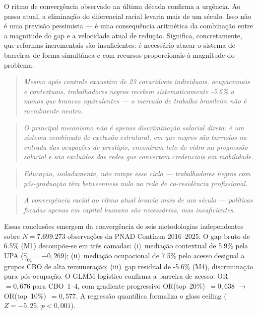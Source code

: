 \documentclass[12pt, a4paper, oneside]{article}
\begin{document}
O ritmo de convergência observado na última década confirma a urgência.
Ao passo atual, a eliminação do diferencial racial levaria mais de um século.
Isso não é uma previsão pessimista --- é uma consequência aritmética da
combinação entre a magnitude do gap e a velocidade atual de redução.
Significa, concretamente, que reformas incrementais são insuficientes:
é necessário atacar o sistema de barreiras de forma simultânea e com recursos
proporcionais à magnitude do problema.

\medskip

\begin{quote}
\textit{Mesmo após controle exaustivo de 23 covariáveis individuais,
ocupacionais e contextuais, trabalhadores negros recebem sistematicamente
-5.6\% a menos que brancos equivalentes --- o mercado de
trabalho brasileiro não é racialmente neutro.}
\end{quote}

\begin{quote}
\textit{O principal mecanismo não é apenas discriminação salarial direta:
é um sistema combinado de exclusão estrutural, em que negros são barrados
na entrada das ocupações de prestígio, encontram teto de vidro na progressão
salarial e são excluídos das redes que convertem credenciais em mobilidade.}
\end{quote}

\begin{quote}
\textit{Educação, isoladamente, não rompe esse ciclo --- trabalhadores negros
com pós-graduação têm betweenness nulo na rede de co-residência profissional.}
\end{quote}

\begin{quote}
\textit{A convergência racial ao ritmo atual levaria mais de um século ---
políticas focadas apenas em capital humano são necessárias, mas insuficientes.}
\end{quote}

\medskip

Essas conclusões emergem da convergência de seis metodologias independentes
sobre $N=7.699.273$ observações da PNAD Contínua 2016--2025.
O gap bruto de 6.5\% (M1) decompõe-se em três camadas:
(i)~mediação contextual de 5.9\% pela UPA
($\hat{\gamma}_{01}=-0{,}269$);
(ii)~mediação ocupacional de 7.5\% pelo acesso desigual a
grupos CBO de alta remuneração;
(iii)~gap residual de -5.6\% (M4), discriminação pura
pós-ocupação.
O GLMM logístico confirma a barreira de acesso:
OR~$=0,676$ para CBO~1--4,
com gradiente progressivo
OR(top~20\%)~$=0,638$ $\to$ OR(top~10\%)~$=0,577$.
A regressão quantílica formaliza o glass ceiling
($Z=-5{,}25$, $p<0{,}001$).
\end{document}
